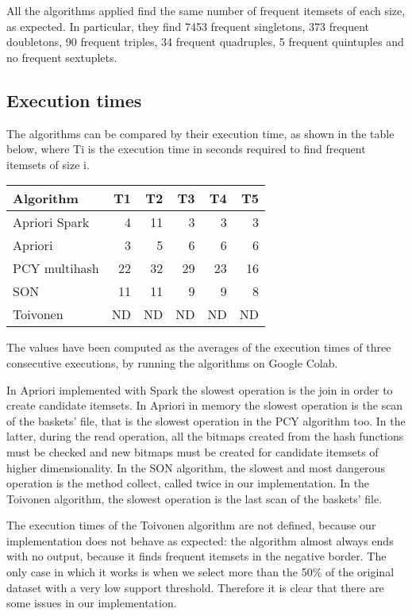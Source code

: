 \documentclass[conference,compsoc]{IEEEtran}
\theoremstyle{definition}
\begin{document}
All the algorithms applied find the same number of frequent itemsets of each size, as expected. In particular, they find 7453 frequent singletons, 373 frequent doubletons, 90 frequent triples, 34 frequent quadruples, 5 frequent quintuples and no frequent sextuplets.

\subsection{Execution times}

The algorithms can be compared by their execution time, as shown in the table below, where Ti is the execution time in seconds required to find frequent itemsets of size i. 

\begin{center}
\begin{tabular}{ |l|r|r|r|r|r| }
    \hline
    Algorithm & T1 & T2 & T3 & T4 & T5\\ 
    \hline\hline
    Apriori Spark & 4 & 11 & 3 & 3 & 3\\
    \hline
    Apriori & 3 & 5 & 6 & 6 & 6\\
    \hline
    PCY multihash & 22 & 32 & 29 & 23 & 16\\
    \hline
    SON & 11 & 11 & 9 & 9 & 8\\
    \hline
    Toivonen & ND & ND & ND & ND & ND\\
    \hline
\end{tabular}    
\end{center}

The values have been computed as the averages of the execution times of three consecutive executions, by running the algorithms on Google Colab.

In Apriori implemented with Spark the slowest operation is the join in order to create candidate itemsets. In Apriori in memory the slowest operation is the scan of the baskets' file, that is the slowest operation in the PCY algorithm too. In the latter, during the read operation, all the bitmaps created from the hash functions must be checked and new bitmaps must be created for candidate itemsets of higher dimensionality. In the SON algorithm, the slowest and most dangerous operation is the method collect, called twice in our implementation. In the Toivonen algorithm, the slowest operation is the last scan of the baskets' file. 

The execution times of the Toivonen algorithm are not defined, because our implementation does not behave as expected: the algorithm almost always ends with no output, because it finds frequent itemsets in the negative border. The only case in which it works is when we select more than the 50\% of the original dataset with a very low support threshold. Therefore it is clear that there are some issues in our implementation. 
\end{document}
